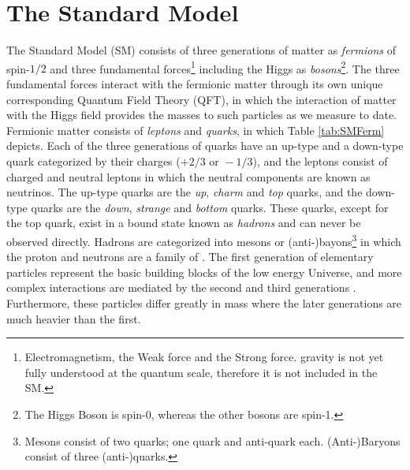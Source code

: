 
\section{The Standard Model}
The Standard Model (SM) consists of three generations of matter as \textit{fermions} of spin-$1/2$ and three fundamental forces\footnote{Electromagnetism, the Weak force and the Strong force. gravity is not yet fully understood at the quantum scale, therefore it is not included in the SM.} including the Higgs as \textit{bosons}\footnote{The Higgs Boson is spin-0, whereas the other bosons are spin-1.}. The three fundamental forces interact with the fermionic matter through its own unique corresponding Quantum Field Theory (QFT), in which the interaction of matter with the Higgs field provides the masses to such particles as we measure to date. \\

Fermionic matter consists of \textit{leptons} and \textit{quarks}, in which Table \ref{tab:SMFerm} depicts. Each of the three generations of quarks have an up-type and a down-type quark categorized by their charges ($+2/3 \text{ or } -1/3$), and the leptons consist of charged and neutral leptons in which the neutral components are known as neutrinos. The up-type quarks are the \textit{up}, \textit{charm} and \textit{top} quarks, and the down-type quarks are the \textit{down}, \textit{strange} and \textit{bottom} quarks. These quarks, except for the top quark, exist in a bound state known as \textit{hadrons} and can never be observed directly. Hadrons are categorized into mesons or (anti-)bayons\footnote{Mesons consist of two quarks; one quark and anti-quark each. (Anti-)Baryons consist of three (anti-)quarks.} in which the proton and neutrons are a family of \cite{thomson2013modern}. The first generation of elementary particles represent the basic building blocks of the low energy Universe, and more complex interactions are mediated by the second and third generations \cite{thomson2013modern}. Furthermore, these particles differ greatly in mass where the later generations are much heavier than the first. \\


